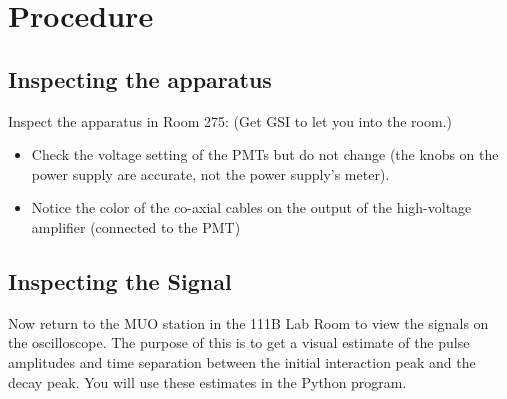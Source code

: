 \documentclass{../lab}
\begin{document}
\section{Procedure}

\subsection{Inspecting the apparatus}\label{sec:Inspect}
    Inspect the apparatus in Room 275: (Get GSI to let you into the room.)

    \begin{itemize}
        \item Check the voltage setting of the PMTs but do not change (the knobs on the power supply are accurate, not the power supply's meter).

        \item Notice the color of the co-axial cables on the output of the high-voltage amplifier (connected to the PMT)

    \end{itemize}


\subsection{Inspecting the Signal}
    Now return to the MUO station in the 111B Lab Room to view the signals on the oscilloscope. The purpose of this is to get a visual estimate of the pulse amplitudes and time separation between the initial interaction peak and the decay peak. You will use these estimates in the Python program.
\end{document}

